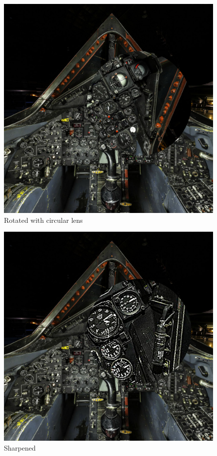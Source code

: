 \documentclass[12pt,letterpaper]{article}
\begin{document}
\begin{figure}[!h]
    \centering
    \includegraphics[width=1.0\textwidth]{img/circlerot.png}
    \caption{Rotated with circular lens}
\end{figure}

\begin{figure}[!h]
    \centering
    \includegraphics[width=1.0\textwidth]{img/sharp.png}
    \caption{Sharpened}
\end{figure}
\end{document}
